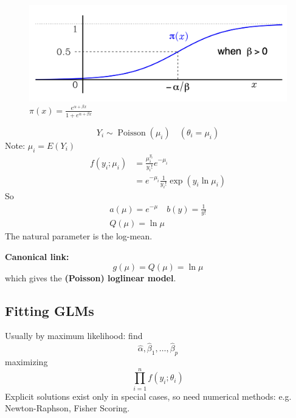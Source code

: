 \documentclass[11pt]{elegantbook}
\begin{document}
\begin{example}
\begin{enumerate}[$\bullet$]
\begin{equation}
\begin{aligned}
            \end{aligned}
            \nonumber
        \end{equation}
        \begin{center}\begin{figure}[htbp]
            \centering
            \includegraphics[scale=0.18]{logit.png}
            \caption{$\pi(x)=\frac{e^{\alpha+\beta x}}{1+e^{\alpha+\beta x}}$}
            \label{}
        \end{figure}\end{center}
    \end{enumerate}
\end{example}

\begin{example}
    $$
    Y_i \sim \operatorname{Poisson}\left(\mu_i\right) \quad\left(\theta_i=\mu_i\right)
    $$
    Note: $\mu_i=E\left(Y_i\right)$
    $$
    \begin{aligned}
    f\left(y_i ; \mu_i\right) & =\frac{\mu_i^{y_i}}{y_{i} !} e^{-\mu_i} \\
    & =e^{-\mu_i} \frac{1}{y_{i} !} \exp \left(y_i \ln \mu_i\right)
    \end{aligned}
    $$
    So
    $$
    \begin{gathered}
    a(\mu)=e^{-\mu} \quad b(y)=\frac{1}{y !} \\
    Q(\mu)=\ln \mu
    \end{gathered}
    $$
    The natural parameter is the log-mean.

    \textbf{Canonical link:}
    $$
    g(\mu)=Q(\mu)=\ln \mu
    $$
    which gives the \textbf{(Poisson) loglinear model}.
\end{example}

\subsection{Fitting GLMs}
Usually by maximum likelihood: find
$$
\hat{\alpha}, \hat{\beta}_1, \ldots, \hat{\beta}_p
$$
maximizing
$$
\prod_{i=1}^n f\left(y_i ; \theta_i\right)
$$
Explicit solutions exist only in special cases, so need numerical methods: e.g. Newton-Raphson, Fisher Scoring.
\end{document}
